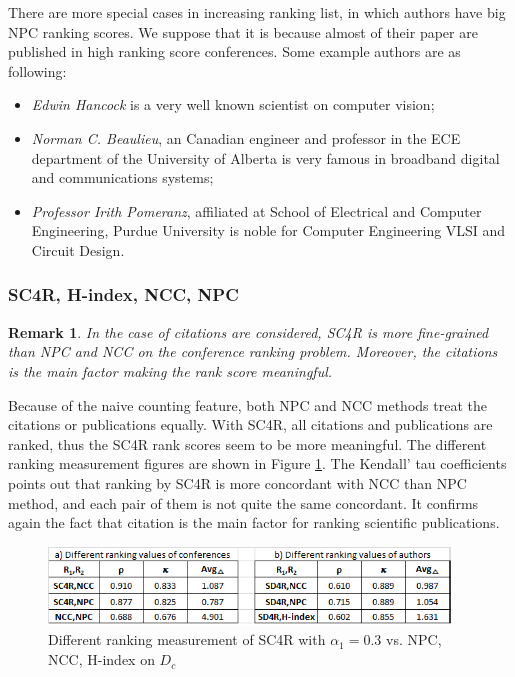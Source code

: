 \documentclass[10pt,leqno,twoside]{article}
\newtheorem{remark}{\indent Remark}[section]
\begin{document}
There are more special cases in increasing ranking list, in which authors have big NPC ranking scores. We suppose that it is because almost of their paper are published in high ranking score conferences. Some example authors are as following: 
\begin{itemize}
\item \textit{Edwin Hancock} is a very well known scientist on computer vision;
\item \textit{Norman C. Beaulieu}, an Canadian engineer and professor in the ECE department of the University of Alberta is very famous in broadband digital and communications systems;
\item \textit{Professor Irith Pomeranz}, affiliated at School of Electrical and Computer Engineering, Purdue University %
is noble for Computer Engineering
VLSI and Circuit Design.
\end{itemize}
\subsubsection{SC4R, H-index, NCC, NPC}
\begin{remark}
In the case of citations are considered, SC4R is more fine-grained than NPC and NCC on the conference ranking problem. Moreover, the citations is the main factor making the rank score meaningful.
\end{remark}

Because of the naive counting feature, both NPC and NCC methods treat the citations or publications equally. With SC4R, all citations and publications are ranked, thus the SC4R rank scores seem to be more meaningful. 
The different ranking measurement figures are shown in Figure \ref{Fig:DiffRank}.
The Kendall' tau coefficients points out that ranking by SC4R is more concordant with NCC than NPC method, and each pair of them is not quite the same concordant. It confirms again the fact that citation is the main factor for ranking scientific publications.

\begin{figure}
	\caption{Different ranking measurement of SC4R with $\alpha_1=0.3$ vs. NPC, NCC, H-index on $D_c$}
	\label{Fig:DiffRank}
    \centering
    \includegraphics[width=0.95\textwidth]{DiffRank}
\end{figure}
%
\end{document}
